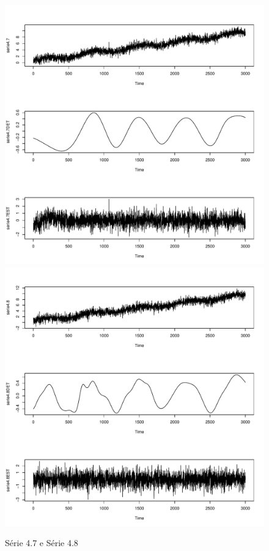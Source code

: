 \graphicspath{{imagens/}}
\begin{figure}[H]
\begin{center}
  \includegraphics[scale=0.43]{serie4_7.pdf} \quad
  \includegraphics[scale=0.43]{serie4_8.pdf}
  \caption{Série 4.7 e Série 4.8}

\end{center}
\end{figure}

